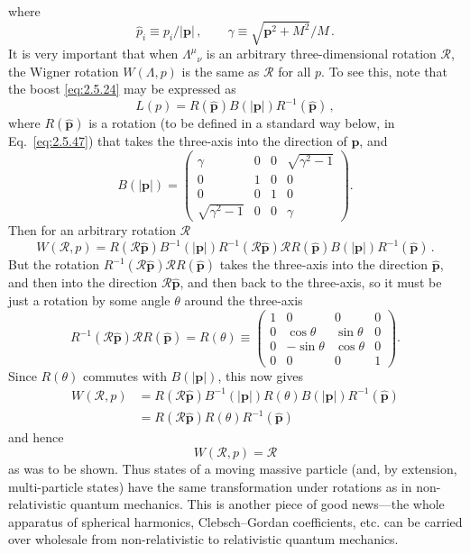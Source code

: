 where
\[
\hat p_i\equiv p_i/|\mathbf{p}|\,,
\qquad
\gamma\equiv\sqrt{\mathbf{p}^2+M^2}/M\,.
\]
It is very important that when $\Lambda^\mu{}_{\nu}$ is an arbitrary
three-dimensional rotation $\mathcal{R}$, the Wigner rotation
$W(\Lambda,p)$ is the same as $\mathcal{R}$ for all $p$. To see this, note that
the boost \eqref{eq:2.5.24} may be expressed as
\[
L(p)=R(\hat{\mathbf{p}})B(|\mathbf{p}|)R^{-1}(\hat{\mathbf{p}})\,,
\]
where $R(\hat{\mathbf{p}})$ is a rotation (to be defined in a standard way
below, in Eq.~\eqref{eq:2.5.47}) that takes the three-axis into the direction of
$\mathbf{p}$, and
\[
B(|\mathbf{p}|)=
\begin{pmatrix}
\gamma&0&0&\sqrt{\gamma^2-1}\\
0&1&0&0\\
0&0&1&0\\
\sqrt{\gamma^2-1}&0&0&\gamma
\end{pmatrix}.
\]
Then for an arbitrary rotation $\mathcal{R}$
\[
W(\mathcal{R},p)=R(\mathcal{R}\hat{\mathbf{p}})
B^{-1}(|\mathbf{p}|)R^{-1}(\mathcal{R}\hat{\mathbf{p}})
\mathcal{R}R(\hat{\mathbf{p}})B(|\mathbf{p}|)R^{-1}(\hat{\mathbf{p}})\,.
\]
But the rotation
$R^{-1}(\mathcal{R}\hat{\mathbf{p}})\mathcal{R}R(\hat{\mathbf{p}})$ takes the
three-axis into the direction $\hat{\mathbf{p}}$, and then into the direction
$\mathcal{R}\hat{\mathbf{p}}$, and then back to the three-axis, so it must be
just a rotation by some angle $\theta$ around the three-axis
\[
R^{-1}(\mathcal{R}\hat{\mathbf{p}})\mathcal{R}R(\hat{\mathbf{p}})
=R(\theta)\equiv
\begin{pmatrix}
1&0&0&0\\
0&\cos\theta&\sin\theta&0\\
0&-\sin\theta&\cos\theta&0\\
0&0&0&1
\end{pmatrix}.
\]
Since $R(\theta)$ commutes with $B(|\mathbf{p}|)$, this now gives
\[
\begin{aligned}
W(\mathcal{R},p)
&=R(\mathcal{R}\hat{\mathbf{p}})B^{-1}(|\mathbf{p}|)R(\theta)
B(|\mathbf{p}|)R^{-1}(\hat{\mathbf{p}})\\
&=R(\mathcal{R}\hat{\mathbf{p}})R(\theta)R^{-1}(\hat{\mathbf{p}})
\end{aligned}
\]
and hence
\[
W(\mathcal{R},p)=\mathcal{R}
\]
as was to be shown. Thus states of a moving massive particle (and, by
extension, multi-particle states) have the same transformation under rotations
as in non-relativistic quantum mechanics. This is another piece of good
news---the whole apparatus of spherical harmonics, Clebsch--Gordan
coefficients, etc. can be carried over wholesale from non-relativistic to
relativistic quantum mechanics.

